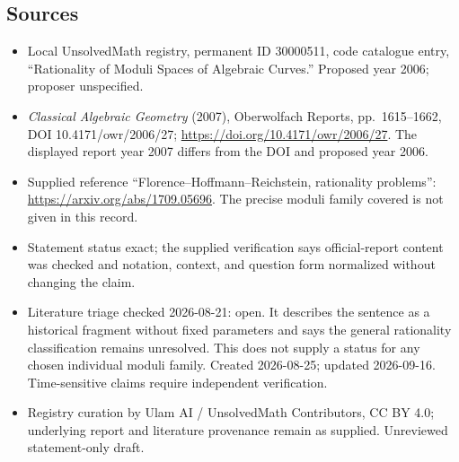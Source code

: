\documentclass[11pt]{article}
\begin{document}
\subsection{Sources}
\begin{itemize}
\item Local UnsolvedMath registry, permanent ID 30000511, code catalogue entry, ``Rationality of Moduli Spaces of Algebraic Curves.'' Proposed year 2006; proposer unspecified.
\item \emph{Classical Algebraic Geometry} (2007), Oberwolfach Reports, pp.\ 1615--1662, DOI 10.4171/owr/2006/27; \url{https://doi.org/10.4171/owr/2006/27}. The displayed report year 2007 differs from the DOI and proposed year 2006.
\item Supplied reference ``Florence--Hoffmann--Reichstein, rationality problems'': \url{https://arxiv.org/abs/1709.05696}. The precise moduli family covered is not given in this record.
\item Statement status exact; the supplied verification says official-report content was checked and notation, context, and question form normalized without changing the claim.
\item Literature triage checked 2026-08-21: open. It describes the sentence as a historical fragment without fixed parameters and says the general rationality classification remains unresolved. This does not supply a status for any chosen individual moduli family. Created 2026-08-25; updated 2026-09-16. Time-sensitive claims require independent verification.
\item Registry curation by Ulam AI / UnsolvedMath Contributors, CC BY 4.0; underlying report and literature provenance remain as supplied. Unreviewed statement-only draft.
\end{itemize}
\end{document}
